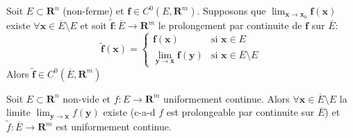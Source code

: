 \begin{lemma}
Soit $E\subset \mathbf{R}^{n}$ (non-ferme) et $\boldsymbol{f}\in C^{0}(E,\mathbf{R}^{m})$. Supposons que $\lim_{ \boldsymbol{x} \to \boldsymbol{x}_{0} }\boldsymbol{f}(\boldsymbol{x})$ existe $\forall \boldsymbol{x}\in \overline{E}\setminus E$ et soit $\boldsymbol{\tilde{f}}:\overline{E}\to \mathbf{R}^{m}$ le prolongement par continuite de $\boldsymbol{f}$ sur $\overline{E}$:
$$
\boldsymbol{\tilde{f}}(\boldsymbol{x})=\begin{cases}
\boldsymbol{f}(\boldsymbol{x}) & \text{si }\boldsymbol{x}\in E \\
\lim_{ \boldsymbol{y} \to \boldsymbol{x} } \boldsymbol{f}(\boldsymbol{y}) & \text{si }\boldsymbol{x}\in \overline{E}\setminus E
\end{cases}
$$
Alors $\boldsymbol{\tilde{f}}\in C^{0}(\overline{E},\mathbf{R}^{m})$ 
\end{lemma}
\begin{theorem}
Soit $E\subset \mathbf{R}^{n}$ non-vide et $f:E\to \mathbf{R}^{m}$ uniformement continue. Alors $\forall \boldsymbol{x}\in \overline{E}\setminus E$ la limite $\lim_{ \boldsymbol{y} \to \boldsymbol{x} }f(\boldsymbol{y})$ existe (c-a-d $f$ est prolongeable par continuite sur $\overline{E}$) et $\tilde{f}:\overline{E}\to \mathbf{R}^{m}$ est uniformement continue.
\end{theorem}
